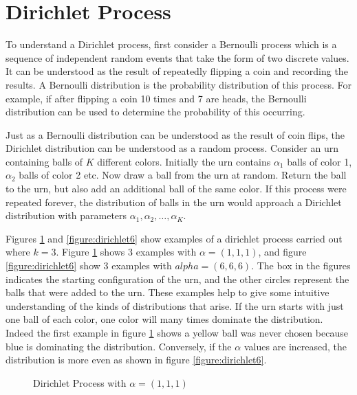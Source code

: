\section{Dirichlet Process}
To understand a Dirichlet process, first consider a Bernoulli process which is a sequence of independent random events that take the form of two discrete values.  It can be understood as the result of repeatedly flipping a coin and recording the results.  A Bernoulli distribution is the probability distribution of this process.  For example, if after flipping a coin 10 times and 7 are heads, the Bernoulli distribution can be used to determine the probability of this occurring.

Just as a Bernoulli distribution can be understood as the result of coin flips, the Dirichlet distribution can be understood as a random process.  Consider an urn containing balls of $K$ different colors.  Initially the urn contains $\alpha_1$ balls of color 1, $\alpha_2$ balls of color 2 etc.  Now draw a ball from the urn at random.  Return the ball to the urn, but also add an additional ball of the same color.  If this process were repeated forever, the distribution of balls in the urn would approach a Dirichlet distribution with parameters $\alpha_1, \alpha_2, \dots, \alpha_K$.

Figures \ref{figure:dirichlet1} and \ref{figure:dirichlet6} show examples of a dirichlet process carried out where $k = 3$.  Figure \ref{figure:dirichlet1} shows 3 examples with $\alpha = (1,1,1)$, and figure \ref{figure:dirichlet6} show 3 examples with $alpha = (6,6,6)$.  The box in the figures indicates the starting configuration of the urn, and the other circles represent the balls that were added to the urn. These examples help to give some intuitive understanding of the kinds of distributions that arise.  If the urn starts with just one ball of each color, one color will many times dominate the distribution.  Indeed the first example in figure \ref{figure:dirichlet1} shows a yellow ball was never chosen because blue is dominating the distribution.  Conversely, if the $\alpha$ values are increased, the distribution is more even as shown in figure \ref{figure:dirichlet6}.

\begin{figure}
\begin{centering}

\caption{Dirichlet Process with $\alpha = (1,1,1)$}
\label{figure:dirichlet1}
\end{centering}
\end{figure}

